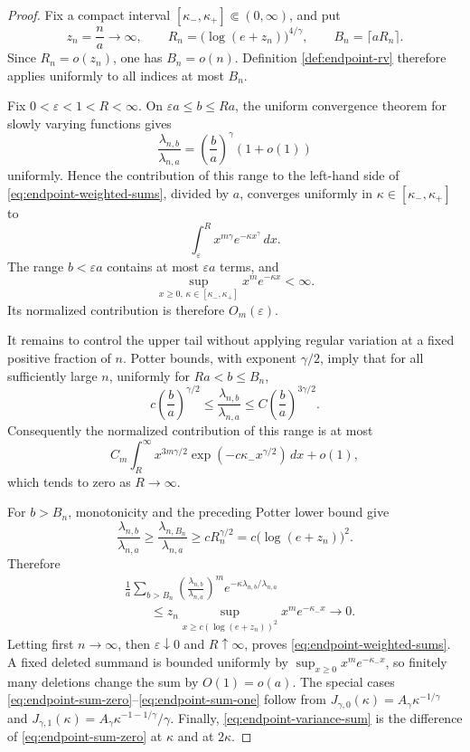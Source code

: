 \documentclass[11pt]{article}
\theoremstyle{remark}
\newcommand{\dd}{\,d}
\begin{document}
\begin{proof}
Fix a compact interval
\([\kappa_-,\kappa_+]\Subset(0,\infty)\), and put
\[
        z_n=\frac na\longrightarrow\infty,
        \qquad
        R_n=\bigl(\log(e+z_n)\bigr)^{4/\gamma},
        \qquad
        B_n=\lceil aR_n\rceil.
\]
Since \(R_n=o(z_n)\), one has \(B_n=o(n)\).  Definition
\ref{def:endpoint-rv} therefore applies uniformly to all indices at most
\(B_n\).

Fix \(0<\varepsilon<1<R<\infty\).  On
\(\varepsilon a\le b\le Ra\), the uniform convergence theorem for slowly
varying functions gives
\[
        \frac{\lambda_{n,b}}{\lambda_{n,a}}
        =\left(\frac ba\right)^\gamma(1+o(1))
\]
uniformly.  Hence the contribution of this range to the left-hand side of
\eqref{eq:endpoint-weighted-sums}, divided by \(a\), converges uniformly in
\(\kappa\in[\kappa_-,\kappa_+]\) to
\[
        \int_\varepsilon^R x^{m\gamma}e^{-\kappa x^\gamma}\dd x.
\]
The range \(b<\varepsilon a\) contains at most \(\varepsilon a\) terms, and
\[
        \sup_{x\ge0,\,\kappa\in[\kappa_-,\kappa_+]}
        x^m e^{-\kappa x}<\infty.
\]
Its normalized contribution is therefore \(O_m(\varepsilon)\).

It remains to control the upper tail without applying regular variation at a
fixed positive fraction of \(n\).  Potter bounds, with exponent
\(\gamma/2\), imply that for all sufficiently large \(n\), uniformly for
\(Ra<b\le B_n\),
\[
 c\left(\frac ba\right)^{\gamma/2}
 \le \frac{\lambda_{n,b}}{\lambda_{n,a}}
 \le C\left(\frac ba\right)^{3\gamma/2}.
\]
Consequently the normalized contribution of this range is at most
\[
 C_m\int_R^\infty
 x^{3m\gamma/2}\exp(-c\kappa_-x^{\gamma/2})\dd x+o(1),
\]
which tends to zero as \(R\to\infty\).

For \(b>B_n\), monotonicity and the preceding Potter lower bound give
\[
 \frac{\lambda_{n,b}}{\lambda_{n,a}}
 \ge \frac{\lambda_{n,B_n}}{\lambda_{n,a}}
 \ge cR_n^{\gamma/2}
 =c\bigl(\log(e+z_n)\bigr)^2.
\]
Therefore
\[
\begin{aligned}
&\frac1a\sum_{b>B_n}
 \left(\frac{\lambda_{n,b}}{\lambda_{n,a}}\right)^m
 e^{-\kappa\lambda_{n,b}/\lambda_{n,a}}\\
&\qquad\le z_n
 \sup_{x\ge c(\log(e+z_n))^2}x^m e^{-\kappa_-x}
 \longrightarrow0.
\end{aligned}
\]
Letting first \(n\to\infty\), then \(\varepsilon\downarrow0\) and
\(R\uparrow\infty\), proves \eqref{eq:endpoint-weighted-sums}.  A fixed
deleted summand is bounded uniformly by
\(\sup_{x\ge0}x^m e^{-\kappa_-x}\), so finitely many deletions change the sum
by \(O(1)=o(a)\).  The special cases
\eqref{eq:endpoint-sum-zero}--\eqref{eq:endpoint-sum-one} follow from
\(J_{\gamma,0}(\kappa)=A_\gamma\kappa^{-1/\gamma}\) and
\(J_{\gamma,1}(\kappa)=A_\gamma\kappa^{-1-1/\gamma}/\gamma\).
Finally, \eqref{eq:endpoint-variance-sum} is the difference of
\eqref{eq:endpoint-sum-zero} at \(\kappa\) and at \(2\kappa\).
\end{proof}
\end{document}
